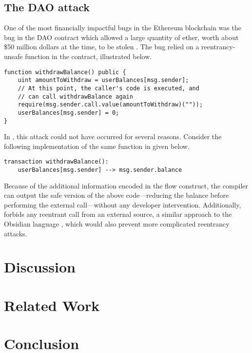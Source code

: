 \documentclass[dvipsnames, usenames, sigconf]{acmart}
\begin{document}
\subsection{The DAO attack}
One of the most financially impactful bugs in the Ethereum blockchain was the bug in the DAO contract which allowed a large quantity of ether, worth about \$50 million dollars at the time, to be stolen .
The bug relied on a reentrancy-unsafe function in the contract, illustrated below.
\begin{lstlisting}[language=Solidity]
function withdrawBalance() public {
    uint amountToWithdraw = userBalances[msg.sender];
    // At this point, the caller's code is executed, and
    // can call withdrawBalance again
    require(msg.sender.call.value(amountToWithdraw)(""));
    userBalances[msg.sender] = 0;
}
\end{lstlisting}

In \langName, this attack could not have occurred for several reasons.
Consider the following implementation of the same function in \langName given below.
\begin{lstlisting}[language=flow]
transaction withdrawBalance():
    userBalances[msg.sender] --> msg.sender.balance
\end{lstlisting}
Because of the additional information encoded in the flow construct, the compiler can output the safe version of the above code---reducing the balance before performing the external call---without any developer intervention.
Additionally, \langName forbids any reentrant call from an external source, a similar approach to the Obsidian language , which would also prevent more complicated reentrancy attacks.

\section{Discussion}

\section{Related Work}

\section{Conclusion}
\end{document}
